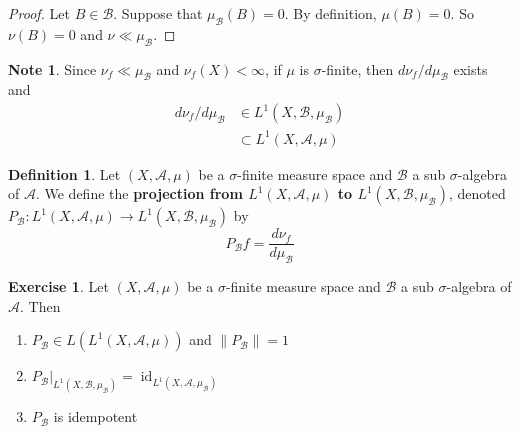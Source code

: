 \documentclass[12pt]{amsart}
\theoremstyle{definition}
\newtheorem{defn}[definition]{Definition}
\newtheorem{note}[definition]{Note}
\newtheorem{ex}[definition]{Exercise}
\newcommand{\sig}{\sigma}
\newcommand{\MA}{\mathcal{A}}
\newcommand{\MB}{\mathcal{B}}
\DeclareMathOperator{\id}{id}
\begin{document}
	\begin{proof}
		Let $B \in \MB$. Suppose that $\mu_{\MB}(B) = 0$. By definition, $\mu(B) = 0$. So $\nu(B) = 0$ and $\nu \ll \mu_{\MB}$.
	\end{proof}
	
	\begin{note}
		Since $\nu_f \ll \mu_{\MB}$ and $\nu_f(X) < \infty$, if $\mu$ is $\sig$-finite, then $d \nu_{f} / d \mu_{\MB}$ exists and 
		\begin{align*}
			d \nu_{f} / d \mu_{\MB} 
			& \in L^1(X, \MB, \mu_{\MB}) \\
			& \subset L^1(X, \MA, \mu)
		\end{align*}
	\end{note}
	
	\begin{defn}
		Let $(X, \MA, \mu)$ be a $\sig$-finite measure space and $\MB$ a sub $\sig$-algebra of $\MA$. We define the \textbf{projection from $L^1(X, \MA, \mu)$ to $L^1(X, \MB, \mu_{\MB})$}, denoted $P_{\MB}:L^1(X, \MA, \mu) \rightarrow L^1(X, \MB, \mu_{\MB})$ by 
		$$P_{\MB}f = \frac{d \nu_f}{d \mu_{\MB}}$$ 
	\end{defn}
	
	\begin{ex}
		Let $(X, \MA, \mu)$ be a $\sig$-finite measure space and $\MB$ a sub $\sig$-algebra of $\MA$. Then 
		\begin{enumerate}
			\item $P_{\MB} \in L(L^1(X, \MA, \mu))$ and $\|P_{\MB}\| = 1$
			\item $P_{\MB}|_{L^1(X, \MB, \mu_{\MB})} = \id_{L^1(X, \MA, \mu_{\MB})}$ 
			\item $P_{\MB}$ is idempotent
		\end{enumerate}
	\end{ex}
	
\end{document}
